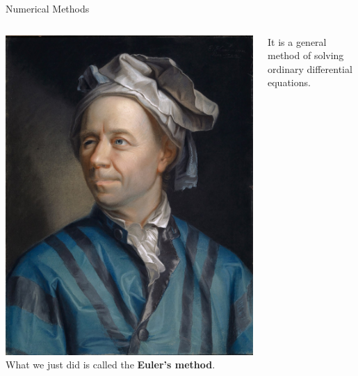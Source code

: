 \documentclass{beamer}
\begin{document}
\begin{frame}{Numerical Methods}
    \begin{columns}
        \centering
        \includegraphics[width=\textwidth]{asset/euler.jpg}
        \centering
        What we just did is called the \textbf{Euler's method}.

        \vspace{0.5cm}

        It is a general method of solving ordinary differential equations.
    \end{columns}

\end{frame}
\end{document}
